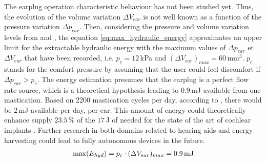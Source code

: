 \documentclass[3p,twocolumn,preprint]{elsarticle}
\begin{document}
The earplug operation characteristic behaviour has not been studied yet. Thus, the evolution of the volume variation $\Delta V_{ear}$ is not well known as a function of the pressure variation $\Delta p_{ear}$. Then, considering the pressure and volume variation levels from \cite{Delnavaz2012} and \cite{Bouchard-Roy2020}, the equation \ref{eq:max_hydraulic_energy} approximates an upper limit for the extractable hydraulic energy with the maximum values of $\Delta p_{ear}$ et $\Delta V_{ear}$ that have been recorded, i.e. $p_c=12$\,kPa and $(\Delta V_{ear})_{max}=60$\,mm$^3$. $p_c$ stands for the comfort pressure by assuming that the user could feel discomfort if $\Delta p_{ear}>p_c$. The energy estimation presumes that the earplug is a perfect flow rate source, which is a theoretical hypothesis leading to $0.9$\,mJ available from one mastication. Based on 2200 mastication cycles per day, according to \cite{Goll2011}, there would be $2$\,mJ available per day, per ear. This amount of energy could theoretically enhance supply $23.5$\,\% of the $17$\,J of needed for the state of the art of cochlear implants \cite{Kulah2022}. Further research in both domains related to hearing aids and energy harvesting could lead to fully autonomous devices in the future.
\begin{align}
	\text{max}(E_{hyd}) = p_c \cdot (\Delta V_{ear})_{max} = 0.9\text{\,mJ}
	\label{eq:max_hydraulic_energy}
\end{align}

\end{document}
